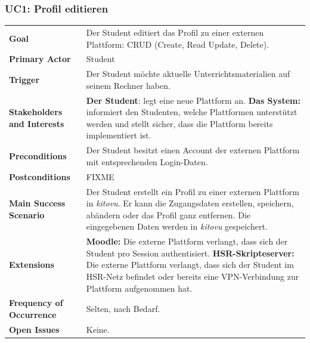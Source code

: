 \documentclass[a4paper]{article}
\begin{document}
\subsubsection{UC1: Profil editieren}
\begin{tabulary}{\linewidth}{lp{30em}}
	\textbf{Goal} & Der Student editiert das Profil zu einer externen Plattform: CRUD (Create, Read Update, Delete). \\
	\textbf{Primary Actor} & Student\\
	\textbf{Trigger} & Der Student möchte aktuelle Unterrichtsmaterialien auf seinem Rechner haben. \\
	\textbf{Stakeholders and Interests} & \textbf{Der Student}: legt eine neue Plattform an. \textbf{Das System:} informiert den Studenten, welche Plattformen unterstützt werden und stellt sicher, dass die Plattform bereits implementiert ist. \\
	\textbf{Preconditions} & Der Student besitzt einen Account der externen Plattform mit entsprechenden Login-Daten.\\
	\textbf{Postconditions} & FIXME \\
	\textbf{Main Success Scenario} & Der Student erstellt ein Profil zu einer externen Plattform in \emph{kitovu}. Er kann die Zugangsdaten erstellen, speichern, abändern oder das Profil ganz entfernen. Die eingegebenen Daten werden in \emph{kitovu} gespeichert. \\
	\textbf{Extensions} & \textbf{Moodle:} Die externe Plattform verlangt, dass sich der Student pro Session authentisiert. \textbf{HSR-Skripteserver:} Die externe Plattform verlangt, dass sich der Student im HSR-Netz befindet oder bereits eine VPN-Verbindung zur Plattform aufgenommen hat.\\
	\textbf{Frequency of Occurrence} & Selten, nach Bedarf. \\
	\textbf{Open Issues} & Keine. \\
\end{tabulary}
\end{document}
